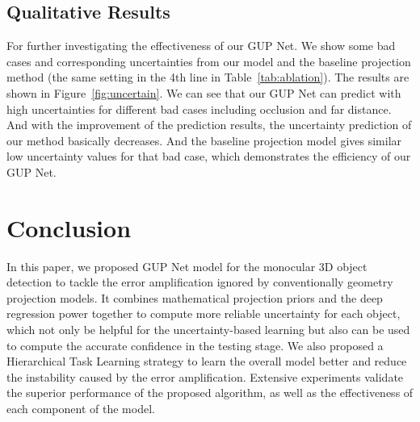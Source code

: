 \documentclass[10pt,twocolumn,letterpaper]{article}
\begin{document}
\subsection{Qualitative Results}
For further investigating the effectiveness of our GUP Net. 
We show some bad cases and corresponding uncertainties from our model and the baseline projection method (the same setting in the 4th line in Table~\ref{tab:ablation}). The results are shown in Figure~\ref{fig:uncertain}. We can see that our GUP Net can predict with high uncertainties for different bad cases including occlusion and far distance. And with the improvement of the prediction results, the uncertainty prediction of our method basically decreases. And the baseline projection model gives similar low uncertainty values for that bad case, which demonstrates the efficiency of our GUP Net.  

 \section{Conclusion}
In this paper, we proposed GUP Net model for the monocular 3D object detection to tackle the error amplification ignored by conventionally geometry projection models. It combines mathematical projection priors and the deep regression power together to compute more reliable uncertainty for each object, which not only be helpful for the uncertainty-based learning but also can be used to compute the accurate confidence in the testing stage. We also proposed a Hierarchical Task Learning strategy to learn the overall model better and reduce the instability caused by the error amplification. Extensive experiments validate the superior performance of the proposed algorithm, as well as the effectiveness of each component of the model.
\end{document}
